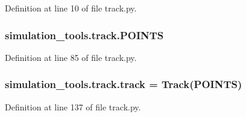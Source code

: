 Definition at line 10 of file track.\+py.

\subsubsection[{\texorpdfstring{P\+O\+I\+N\+TS}{POINTS}}]{\setlength{\rightskip}{0pt plus 5cm}simulation\+\_\+tools.\+track.\+P\+O\+I\+N\+TS}\hypertarget{namespacesimulation__tools_1_1track_ab9ddc4d3ba8bb81a3ce02320f46c8a55}{}\label{namespacesimulation__tools_1_1track_ab9ddc4d3ba8bb81a3ce02320f46c8a55}


Definition at line 85 of file track.\+py.

\subsubsection[{\texorpdfstring{track}{track}}]{\setlength{\rightskip}{0pt plus 5cm}simulation\+\_\+tools.\+track.\+track = {\bf Track}({\bf P\+O\+I\+N\+TS})}\hypertarget{namespacesimulation__tools_1_1track_ac731095c2502c445d46302406cb81651}{}\label{namespacesimulation__tools_1_1track_ac731095c2502c445d46302406cb81651}


Definition at line 137 of file track.\+py.

